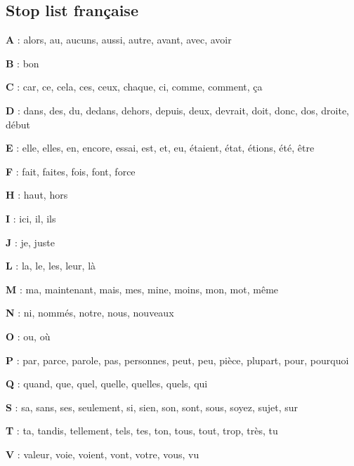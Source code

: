 \subsection{Stop list française}

\textbf{A} : 
alors, 
au, 
aucuns, 
aussi, 
autre, 
avant, 
avec, 
avoir

\textbf{B} :
bon

\textbf{C} :
car, 
ce, 
cela, 
ces, 
ceux, 
chaque, 
ci, 
comme, 
comment, 
ça

\textbf{D} :
dans, 
des, 
du, 
dedans, 
dehors, 
depuis, 
deux, 
devrait, 
doit, 
donc, 
dos, 
droite, 
début

\textbf{E} :
elle, 
elles, 
en, 
encore, 
essai, 
est, 
et, 
eu, 
étaient, 
état, 
étions, 
été, 
être

\textbf{F} :
fait, 
faites, 
fois, 
font, 
force

\textbf{H} :
haut, 
hors

\textbf{I} :
ici, 
il, 
ils

\textbf{J} :
je, 
juste

\textbf{L} :
la, 
le, 
les, 
leur, 
là

\textbf{M} :
ma, 
maintenant, 
mais, 
mes, 
mine, 
moins, 
mon, 
mot, 
même

\textbf{N} :
ni, 
nommés, 
notre, 
nous, 
nouveaux

\textbf{O} :
ou, 
où

\textbf{P} :
par, 
parce, 
parole, 
pas, 
personnes, 
peut, 
peu, 
pièce, 
plupart, 
pour, 
pourquoi

\textbf{Q} :
quand, 
que, 
quel, 
quelle, 
quelles, 
quels, 
qui

\textbf{S} :
sa, 
sans, 
ses, 
seulement, 
si, 
sien, 
son, 
sont, 
sous, 
soyez, 
sujet, 
sur

\textbf{T} :
ta, 
tandis, 
tellement, 
tels, 
tes, 
ton, 
tous, 
tout, 
trop, 
très, 
tu

\textbf{V} :
valeur, 
voie, 
voient, 
vont, 
votre, 
vous, 
vu